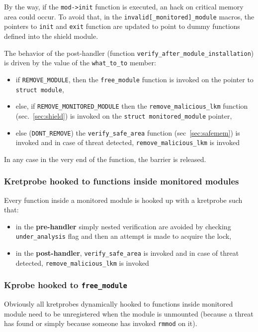 \documentclass{article}
\begin{document}
	By the way, if the \texttt{mod->init} function is executed, an hack on critical memory area could occur. To avoid
	that, in the \texttt{invalid[\_monitored]\_module} macros, the pointers to \texttt{init} and \texttt{exit} function
	are updated to point to dummy functions defined into the shield module.

	The behavior of the post-handler (function \texttt{verify\_after\_module\_installation}) is driven by the value of
	the \texttt{what\_to\_to} member:
	\begin{itemize}
		\item if \texttt{REMOVE\_MODULE}, then the \texttt{free\_module} function is invoked on the pointer to \texttt{struct
		module},
		\item else, if \texttt{REMOVE\_MONITORED\_MODULE} then the \texttt{remove\_malicious\_lkm} function (sec.~\ref{sec:shield}) is invoked on the \texttt{struct monitored\_module} pointer,
		\item else (\texttt{DONT\_REMOVE}) the \texttt{verify\_safe\_area} function (sec~\ref{sec:safemem}) is invoked and in case of threat detected, \texttt{remove\_malicious\_lkm} is invoked
	\end{itemize}

	In any case in the very end of the function, the barrier is released.

	\subsubsection{Kretprobe hooked to functions inside monitored modules}
	Every function inside a monitored module is hooked up with a kretprobe such that:
	\begin{itemize}
		\item in the \textbf{pre-handler} simply nested verification are avoided by checking \texttt{under\_analysis}
		flag and then an attempt is made to acquire the lock,
		\item in the \textbf{post-handler}, \texttt{verify\_safe\_area} is invoked and in case of threat
		detected, \texttt{remove\_malicious\_lkm} is invoked
	\end{itemize}

	\subsubsection{Kprobe hooked to \texttt{free\_module}}
	Obviously all kretprobes dynamically hooked to functions inside monitored module need to be unregistered when the
	module is unmounted (because a threat has found or simply because someone has invoked \texttt{rmmod} on it).
\end{document}
